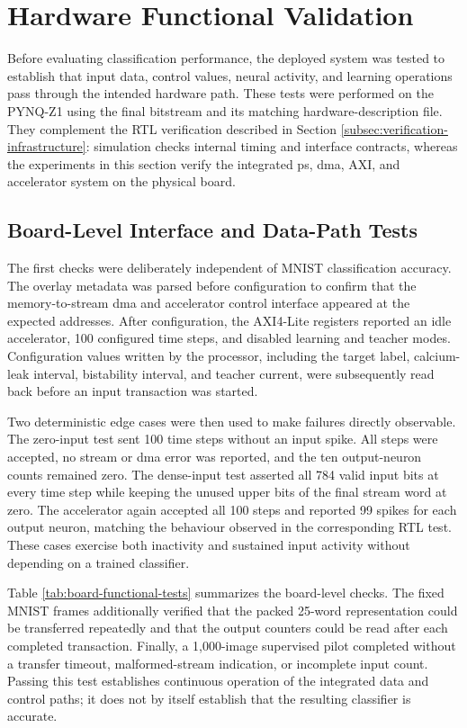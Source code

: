 \section{Hardware Functional Validation}
\label{subsec:hardware-functional-validation}

Before evaluating classification performance, the deployed system was tested to establish that input data, control values, neural activity, and learning operations pass through the intended hardware path. These tests were performed on the PYNQ-Z1 using the final bitstream and its matching hardware-description file. They complement the RTL verification described in Section \ref{subsec:verification-infrastructure}: simulation checks internal timing and interface contracts, whereas the experiments in this section verify the integrated \gls{ps}, \gls{dma}, AXI, and accelerator system on the physical board.

\subsection{Board-Level Interface and Data-Path Tests}

The first checks were deliberately independent of MNIST classification accuracy. The overlay metadata was parsed before configuration to confirm that the memory-to-stream \gls{dma} and accelerator control interface appeared at the expected addresses. After configuration, the AXI4-Lite registers reported an idle accelerator, 100 configured time steps, and disabled learning and teacher modes. Configuration values written by the processor, including the target label, calcium-leak interval, bistability interval, and teacher current, were subsequently read back before an input transaction was started.

Two deterministic edge cases were then used to make failures directly observable. The zero-input test sent 100 time steps without an input spike. All steps were accepted, no stream or \gls{dma} error was reported, and the ten output-neuron counts remained zero. The dense-input test asserted all 784 valid input bits at every time step while keeping the unused upper bits of the final stream word at zero. The accelerator again accepted all 100 steps and reported 99 spikes for each output neuron, matching the behaviour observed in the corresponding RTL test. These cases exercise both inactivity and sustained input activity without depending on a trained classifier.

Table \ref{tab:board-functional-tests} summarizes the board-level checks. The fixed MNIST frames additionally verified that the packed 25-word representation could be transferred repeatedly and that the output counters could be read after each completed transaction. Finally, a 1,000-image supervised pilot completed without a transfer timeout, malformed-stream indication, or incomplete input count. Passing this test establishes continuous operation of the integrated data and control paths; it does not by itself establish that the resulting classifier is accurate.

